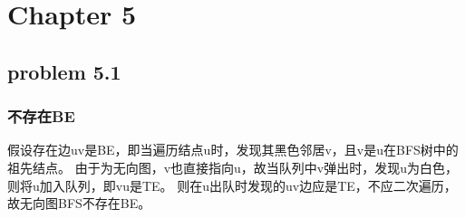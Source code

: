 \documentclass[11pt,a4paper,oneside,oldfontcommands]{ctexart}
\begin{document}
\section*{Chapter 5}
{\subsection*{problem 5.1}}
\subsubsection*{不存在BE}
假设存在边uv是BE，即当遍历结点u时，发现其黑色邻居v，且v是u在BFS树中的祖先结点。
由于为无向图，v也直接指向u，故当队列中v弹出时，发现u为白色，则将u加入队列，即vu是TE。
则在u出队时发现的uv边应是TE，不应二次遍历，故无向图BFS不存在BE。
\end{document}
